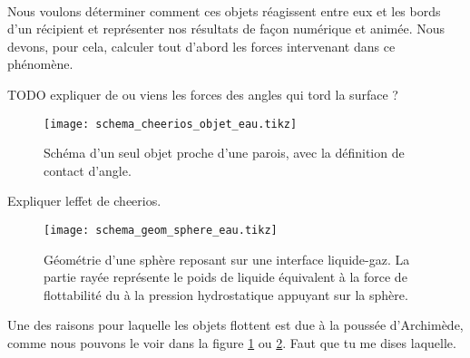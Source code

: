         \paragraph*{}{
            Nous voulons déterminer comment ces objets réagissent entre eux et les bords d'un récipient et représenter nos résultats de façon numérique et animée. Nous devons, pour cela, calculer tout d'abord les forces intervenant dans ce phénomène.
            } 

    TODO expliquer de ou viens les forces des angles qui tord la surface ?

    \begin{figure}[!htb]
        \centering
        \texttt{[image: schema\_cheerios\_objet\_eau.tikz]}
        \caption{Schéma d'un seul objet proche d'une parois, avec la définition de contact d'angle.}
        \label{objet_seul}
    \end{figure}

    Expliquer leffet de cheerios.
    
    \begin{figure}[!htb]
        \centering
        \texttt{[image: schema\_geom\_sphere\_eau.tikz]}
        \caption{Géométrie d'une sphère reposant sur une interface liquide-gaz. La partie rayée représente le poids de liquide équivalent à la force de flottabilité du à la pression hydrostatique appuyant sur la sphère. }
        \label{geom_sphere}
    \end{figure}
    Une des raisons pour laquelle les objets flottent est due à la poussée d'Archimède, comme nous pouvons le voir dans la figure \ref{objet_seul} ou \ref{geom_sphere}. Faut que tu me dises laquelle.
    
